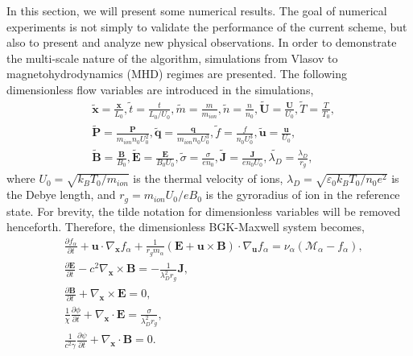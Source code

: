 \documentclass[preprint,3p,12pt,sort&compress]{elsarticle}
\begin{document}
In this section, we will present some numerical results.
The goal of numerical experiments is not simply to validate the performance of the current scheme, but also to present and analyze new physical observations.
In order to demonstrate the multi-scale nature of the algorithm, simulations from Vlasov to magnetohydrodynamics (MHD) regimes are presented. The following dimensionless flow variables are introduced in the simulations,
\begin{equation*}
\begin{aligned}
& \tilde{\mathbf x}=\frac{\mathbf x}{L_0},
\tilde{t}=\frac{t}{L_0 / U_0},
\tilde{m}=\frac{m}{m_{ion}},
\tilde{n}=\frac{n}{n_0},
\tilde{\mathbf U}=\frac{\mathbf U}{U_0}, 
\tilde{T}=\frac{T}{T_0}, \\ 
& \tilde{\mathbf P}=\frac{\mathbf P}{m_{ion} n_0 U_0^2}, 
\tilde{\mathbf q}=\frac{\mathbf q}{m_{ion} n_0 U_0^{3}}, 
\tilde{f}=\frac{f}{n_0 U_0^{3}}, 
\tilde{\mathbf u}=\frac{\mathbf u}{U_0}, \\
&\tilde{\mathbf B}=\frac{\mathbf B}{B_0}, 
\tilde{\mathbf E}=\frac{\mathbf E}{B_0 U_0}, 
\tilde{\sigma}=\frac{\sigma}{e n_0},
\tilde{\mathbf J}=\frac{\mathbf J}{e n_0 U_0}, \tilde{\lambda_D}=\frac{\lambda_D}{r_g},
\end{aligned}
\end{equation*}
where $U_0=\sqrt{k_B T_0/m_{ion}}$ is the thermal velocity of ions, $\lambda_D=\sqrt{\varepsilon_0 k_B T_0/n_0 e^2}$ is the Debye length, and $r_{g}=m_{ion} U_0/e B_0$ is the gyroradius of ion in the reference state.  
For brevity, the tilde notation for dimensionless variables will be removed henceforth. 
Therefore, the dimensionless BGK-Maxwell system becomes,
\begin{equation}
\begin{aligned}
	&\frac{\partial f_{\alpha}}{\partial t}+\mathbf{u} \cdot \nabla_{\mathbf{x}} f_{\alpha}+\frac{1}{r_{g} m_{\alpha}}(\mathbf{E}+\mathbf{u} \times \mathbf{B}) \cdot \nabla_{\mathbf{u}} f_{\alpha}={\nu_{\alpha}}({\mathcal M_{\alpha}-f_{\alpha}}), \\
	&\frac{\partial \mathbf{E}}{\partial t}-c^{2} \nabla_{\mathbf{x}} \times \mathbf{B}=-\frac{1}{\lambda_{D}^{2} r_{g}} \mathbf{J}, \\
	&\frac{\partial \mathbf{B}}{\partial t}+\nabla_{\mathbf{x}} \times \mathbf{E}=0, \\
	&\frac{1}{\chi} \frac{\partial \phi}{\partial t} + \nabla_\mathbf x \cdot \mathbf E = \frac{\sigma}{\lambda_D^2 r_g}, \\
	&\frac{1}{c^2 \gamma} \frac{\partial \psi}{\partial t} + \nabla_\mathbf x \cdot \mathbf B = 0. \\
\end{aligned}
\end{equation}
\end{document}
